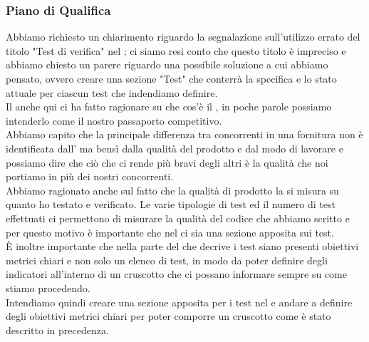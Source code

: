 	
	\subsubsection*{Piano di Qualifica}
	Abbiamo richiesto un chiarimento riguardo la segnalazione sull'utilizzo errato del titolo "Test di verifica" nel \PdQ ; ci siamo resi conto che questo titolo è impreciso e abbiamo chiesto un parere riguardo una possibile soluzione a cui abbiamo pensato, ovvero creare una sezione "Test" che conterrà la specifica e lo stato attuale per ciascun test che indendiamo definire. \\
	Il \TV{} anche qui ci ha fatto ragionare su che cos'è il \PdQ, in poche parole possiamo intenderlo come il nostro passaporto competitivo. \\
	Abbiamo capito che la principale differenza tra concorrenti in una fornitura non è identificata dall'\AdR{} ma bensì dalla qualità del prodotto e dal modo di lavorare e possiamo dire che ciò che ci rende più bravi degli altri è la qualità che noi portiamo in più dei nostri concorrenti. \\
	Abbiamo ragionato anche sul fatto che la qualità di prodotto la si misura su quanto ho testato e verificato. Le varie tipologie di test ed il numero di test effettuati ci permettono di misurare la qualità del codice che abbiamo scritto e per questo motivo è importante che nel \PdQ{} ci sia una sezione apposita sui test. \\
	È inoltre importante che nella parte del \PdQ{} che decrive i test siano presenti obiettivi metrici chiari e non solo un elenco di test, in modo da poter definire degli indicatori all'interno di un cruscotto che ci possano informare sempre su come stiamo procedendo. \\
	Intendiamo quindi creare una sezione apposita per i test nel \PdQ{} e andare a definire degli obiettivi metrici chiari per poter comporre un cruscotto come è stato descritto in precedenza.
	
